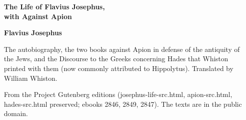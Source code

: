 \documentclass[11pt,letterpaper]{article}
\begin{document}
\color{ink}

\begin{titlepage}
\centering
\vspace*{4em}
{\LARGE\bfseries\color{heading} The Life of Flavius Josephus,\\[0.3em]with Against Apion\par}
\vspace{2em}
{\Large\bfseries\color{heading} Flavius Josephus\par}
\vspace{2.5em}
{\itshape\color{subhead}\parbox{0.8\linewidth}{\centering The autobiography, the two books against Apion in defense of the antiquity of the Jews, and the Discourse to the Greeks concerning Hades that Whiston printed with them (now commonly attributed to Hippolytus). Translated by William Whiston.\par}}
\vfill
{\small From the Project Gutenberg editions (josephus-life-src.html, apion-src.html, hades-src.html preserved; ebooks 2846, 2849, 2847). The texts are in the public domain.\par}
\vspace{2em}
\end{titlepage}

\tableofcontents


\end{document}
